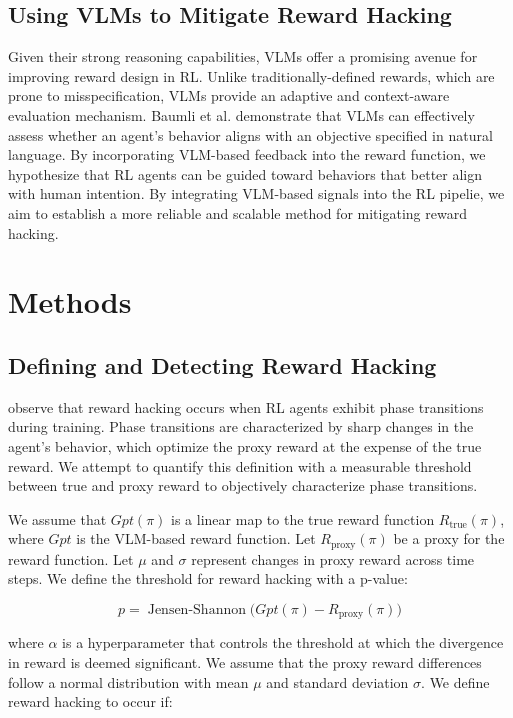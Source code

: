 \documentclass{article}
\begin{document}
\subsection{Using VLMs to Mitigate Reward Hacking}
Given their strong reasoning capabilities, VLMs offer a promising avenue for improving reward design in RL. Unlike traditionally-defined rewards, which are prone to misspecification, VLMs provide an adaptive and context-aware evaluation mechanism. Baumli et al. demonstrate that VLMs can effectively assess whether an agent's behavior aligns with an objective specified in natural language. By incorporating VLM-based feedback into the reward function, we hypothesize that RL agents can be guided toward behaviors that better align with human intention. By integrating VLM-based signals into the RL pipelie, we aim to establish a more reliable and scalable method for mitigating reward hacking.

\section{Methods}

\subsection{Defining and Detecting Reward Hacking}
\cite{pan2022effectsrewardmisspecificationmapping} observe that reward hacking occurs when RL agents exhibit phase transitions during training. Phase transitions are characterized by sharp changes in the agent's behavior, which optimize the proxy reward at the expense of the true reward. We attempt to quantify this definition with a measurable threshold between true and proxy reward to objectively characterize phase transitions.

We assume that $Gpt(\pi)$ is a linear map to the true reward function $R_{\text{true}}(\pi)$, where $Gpt$ is the VLM-based reward function. Let $R_{\text{proxy}}(\pi)$ be a proxy for the reward function. Let $\mu$ and $\sigma$ represent changes in proxy reward across time steps. We define the threshold for reward hacking with a p-value:

\begin{equation}
    p = \operatorname{Jensen-Shannon}\big(Gpt(\pi) - R_{\text{proxy}}(\pi)\big)
\end{equation}

where $\alpha$ is a hyperparameter that controls the threshold at which the divergence in reward is deemed significant. We assume that the proxy reward differences follow a normal distribution with mean $\mu$ and standard deviation $\sigma$. We define reward hacking to occur if:
\end{document}
